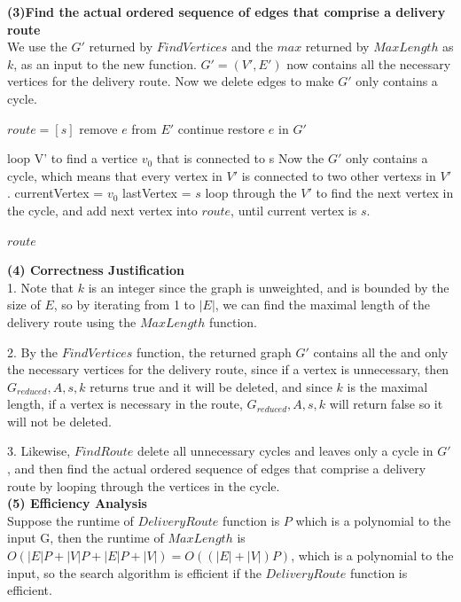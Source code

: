 \documentclass[11pt,addpoints,answers]{exam}
\newcommand{\DeliveryRoute}{\textsc{Delivery-Route}}
\begin{document}
\begin{questions}
\begin{solution}
\textbf{(3)Find the actual ordered sequence of edges that comprise a delivery route}
\\We use the $G'$ returned by $FindVertices$ and the $max$ returned by $MaxLength$ as $k$, as an input to the new function. $G' = (V', E')$ now contains all the necessary vertices for the delivery route. Now we delete edges to make $G'$ only contains a cycle.
\begin{algorithm}[H]
    \begin{algorithmic}[1]
          \State $route = [s]$
            \State remove $e$ from $E'$
            \If{$\DeliveryRoute(G', A, s, k)$ returns true}
                \State continue
            \Else
                \State restore $e$ in $G'$
            \EndIf
          \EndFor 

          \State loop V' to find a vertice $v_0$ that is connected to s
          \Comment Now the $G'$ only contains a cycle, which means that every vertex in $V'$ is connected to two other vertexs in $V'$.
          \State currentVertex = $v_0$
          \State lastVertex = $s$
          \State loop through the $V'$ to find the next vertex in the cycle, and add next vertex into $route$, until current vertex is $s$.

          \State \Return $route$
      \EndFunction
    \end{algorithmic}
    \end{algorithm}
\textbf{(4) Correctness Justification}\\
1. Note that $k$ is an integer since the graph is unweighted, and is bounded by the size of $E$, so by iterating from 1 to $|E|$, we can find the maximal length of the delivery route using the $MaxLength$ function.

2. By the $FindVertices$ function, the returned graph $G'$ contains all the and only the necessary vertices for the delivery route, since if a vertex is unnecessary, then $G_{reduced}, A, s, k$ returns true and it will be deleted, and since $k$ is the maximal length, if a vertex is necessary in the route, $G_{reduced}, A, s, k$ will return false so it will not be deleted. 

3. Likewise, $FindRoute$ delete all unnecessary cycles and leaves only a cycle in $G'$, and then find the actual ordered sequence of edges that comprise a delivery route by looping through the vertices in the cycle.\\
\textbf{(5) Efficiency Analysis}\\
Suppose the runtime of $DeliveryRoute$ function is $P$ which is a polynomial to the input G, then the runtime of $MaxLength$ is $O(|E|P + |V|P + |E|P +|V|) = O((|E|+|V|)P)$, which is a polynomial to the input, so the search algorithm is efficient if the $DeliveryRoute$ function is efficient.
    \end{solution}


\end{questions}
\end{document}
